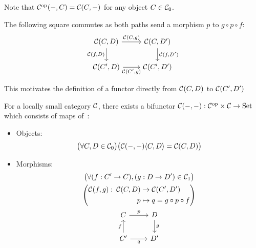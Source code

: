 \begin{remark}\label{rmk:op_hom_functor}
  Note that $\mathcal{C}^{\mathrm{op}}({\--}, C) = \mathcal{C}(C, {\--})$ for any object $C\in\mathcal{C}_0$.
\end{remark}

\begin{remark}
  The following square commutes as both paths send a morphism $p$ to $g\circ
  p\circ f$:
  \[\begin{tikzcd}[ampersand replacement=\&]
    {\C(C,D)} \& {\C(C,D')} \\
    {\C(C', D)} \& {\C(C',D')}
    \arrow["{\C(C,g)}", from=1-1, to=1-2]
    \arrow["{\C(f,D)}"', from=1-1, to=2-1]
    \arrow["{\C(C', g)}"', from=2-1, to=2-2]
    \arrow["{\C(f,D')}", from=1-2, to=2-2]
  \end{tikzcd}\]

  This motivates the definition of a functor directly from $\mathcal{C}(C, D)$ to
  $\mathcal{C}(C',D')$
\end{remark}

\begin{definition}
  For a locally small category $\mathcal{C}$, there exists a bifunctor $\mathcal{C}({\--}, {\--})
  : \mathcal{C}^{\mathrm{op}} \times \mathcal{C} \to \mathrm{Set}$ which consists of maps
  of~\parencite[p.~90]{leinster:basic_category_theory}:
  \begin{itemize}
    \item Objects:
      \[\big(\forall C, D \in \mathcal{C}_0\big)
        \big(\mathcal{C}({\--}, {\--})\langle C,D\rangle = \mathcal{C}(C, D)\big)\]
    \item Morphisms:
      \[
        \begin{gathered}
          \big(\forall (f:C'\to C),(g: D\to D')\in \C_1\big)\\
          \left(
            \begin{aligned}
              \C(f, g):&&\!\!\! \C(C, D) &\to \C(C', D')\\
              &&p &\mapsto q = g\circ p \circ f
            \end{aligned}
          \right)\\
          \begin{tikzcd}[ampersand replacement=\&]
            C \& D \\
            {C'} \& {D'}
            \arrow["f", from=2-1, to=1-1]
            \arrow["g", from=1-2, to=2-2]
            \arrow["p", from=1-1, to=1-2]
            \arrow["q"', from=2-1, to=2-2]
          \end{tikzcd}
        \end{gathered}
      \]
  \end{itemize}
\end{definition}